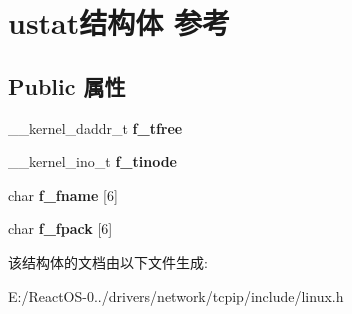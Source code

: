 \hypertarget{structustat}{}\section{ustat结构体 参考}
\label{structustat}
\subsection*{Public 属性}
\begin{DoxyCompactItemize}
\item 
\mbox{\label{structustat_a1131199dbec641932bd8d4a96a183d81}} 
\+\_\+\+\_\+kernel\+\_\+daddr\+\_\+t {\bfseries f\+\_\+tfree}
\item 
\mbox{\label{structustat_a21dd9a2f072abf909631791d414ce3b3}} 
\+\_\+\+\_\+kernel\+\_\+ino\+\_\+t {\bfseries f\+\_\+tinode}
\item 
\mbox{\label{structustat_a7f1029770629fc087d4da8489ad676fd}} 
char {\bfseries f\+\_\+fname} \mbox{[}6\mbox{]}
\item 
\mbox{\label{structustat_a18fc5d904886dac95ac9ae50c40b6423}} 
char {\bfseries f\+\_\+fpack} \mbox{[}6\mbox{]}
\end{DoxyCompactItemize}


该结构体的文档由以下文件生成\+:\begin{DoxyCompactItemize}
\item 
E\+:/\+React\+O\+S-\/0../drivers/network/tcpip/include/linux.\+h\end{DoxyCompactItemize}
